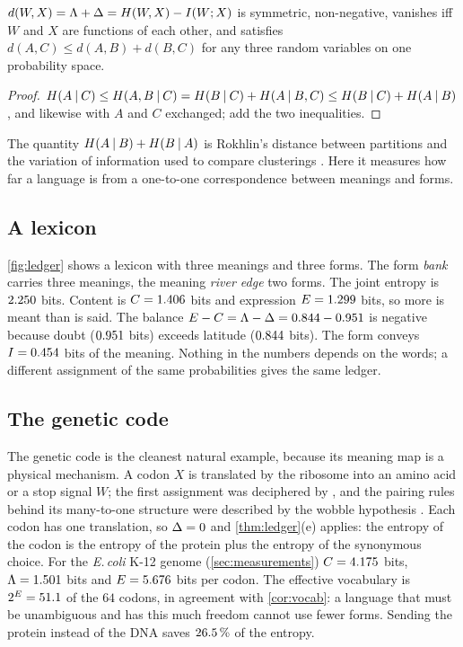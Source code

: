 \begin{proposition}\label{prop:dist}
$d(W,X)=\Lambda+\Delta=H(W,X)-I(W;X)$ is symmetric, non-negative, vanishes iff $W$ and $X$ are functions of each other, and satisfies $d(A,C)\le d(A,B)+d(B,C)$ for any three random variables on one probability space.
\end{proposition}
\begin{proof}
$H(A\mathbin{\vert} C)\le H(A,B\mathbin{\vert} C)=H(B\mathbin{\vert} C)+H(A\mathbin{\vert} B,C)\le H(B\mathbin{\vert} C)+H(A\mathbin{\vert} B)$, and likewise with $A$ and $C$ exchanged; add the two inequalities.
\end{proof}
The quantity $H(A\mathbin{\vert} B)+H(B\mathbin{\vert} A)$ is Rokhlin's distance between partitions \citep{rokhlin1967} and the variation of information used to compare clusterings \citep{meila2007}. Here it measures how far a language is from a one-to-one correspondence between meanings and forms.

\subsection{A lexicon}
\cref{fig:ledger} shows a lexicon with three meanings and three forms. The form \emph{bank} carries three meanings, the meaning \emph{river edge} two forms. The joint entropy is $2.250$ bits. Content is $C=1.406$ bits and expression $E=1.299$ bits, so more is meant than is said. The balance $E-C=\Lambda-\Delta=0.844-0.951$ is negative because doubt ($0.951$ bits) exceeds latitude ($0.844$ bits). The form conveys $I=0.454$ bits of the meaning. Nothing in the numbers depends on the words; a different assignment of the same probabilities gives the same ledger.


\subsection{The genetic code}
The genetic code is the cleanest natural example, because its meaning map is a physical mechanism. A codon $X$ is translated by the ribosome into an amino acid or a stop signal $W$; the first assignment was deciphered by \citet{nirenberg1961}, and the pairing rules behind its many-to-one structure were described by the wobble hypothesis \citep{crick1966}. Each codon has one translation, so $\Delta=0$ and \cref{thm:ledger}(e) applies: the entropy of the codon is the entropy of the protein plus the entropy of the synonymous choice. For the \emph{E.\,coli} K-12 genome (\cref{sec:measurements}) $C=4.175$ bits, $\Lambda=1.501$ bits and $E=5.676$ bits per codon. The effective vocabulary is $2^{E}=51.1$ of the $64$ codons, in agreement with \cref{cor:vocab}: a language that must be unambiguous and has this much freedom cannot use fewer forms. Sending the protein instead of the DNA saves $26.5\,\%$ of the entropy.
